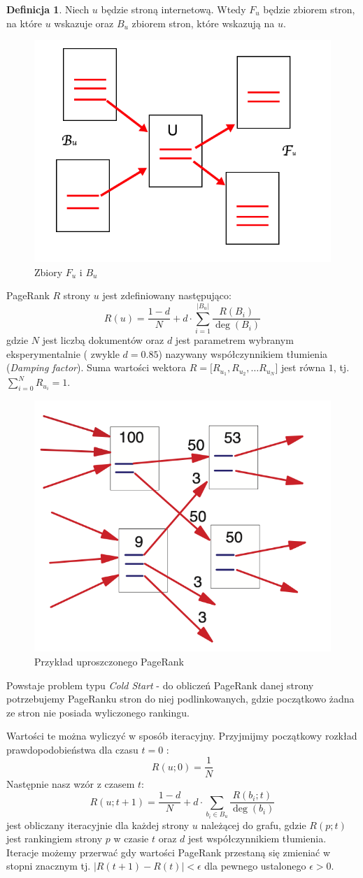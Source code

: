 \documentclass[licencjacka]{pracadypl}
\theoremstyle{definition}
\newtheorem{de}{Definicja}
\begin{document}
\begin{de}
	Niech $u$ będzie stroną internetową. 
	Wtedy $F_u$ będzie zbiorem stron, na które $u$ wskazuje oraz $B_u$ zbiorem stron, które wskazują na $u$.
	\begin{figure}[H]
		\centering
		\includegraphics[width=0.4\linewidth]{img/pagerank-link.png}
		\caption{Zbiory $F_u$ i $B_u$}
	\end{figure}
	
	PageRank $R$ strony $u$ jest zdefiniowany następująco:
	\[
	R(u) = 
	\frac{1-d}{N} +
	d \cdot 
	\sum\limits_{i=1}^{|B_u|}
	\frac{R(B_i)}
	{\deg(B_i)}
	\]
	gdzie $N$ jest liczbą dokumentów oraz $d$ jest parametrem wybranym eksperymentalnie ( zwykle $d=0.85$) nazywany współczynnikiem tłumienia (\textit{Damping factor}).
	Suma wartości wektora $R = \big[ R_{u_1}, R_{u_2}, \dots R_{u_N} \big]$ jest równa $1$, 
	tj. $\sum_{i=0}^{N} R_{u_i} = 1$.
	
\end{de}
\begin{figure}[H]
	\centering
	\includegraphics[width=0.4\linewidth]{img/pagerank-link2.png}
	\caption{Przykład uproszczonego PageRank}
\end{figure}

Powstaje problem typu \textit{Cold Start} - do obliczeń PageRank danej strony potrzebujemy PageRanku stron do niej podlinkowanych, gdzie początkowo żadna ze stron nie posiada wyliczonego rankingu.

Wartości te można wyliczyć w sposób iteracyjny.
Przyjmijmy początkowy rozkład prawdopodobieństwa dla czasu $t = 0$ :
\[
	R(u;0) = \frac{1}{N}
\]
Następnie nasz wzór z czasem $t$: 
	\[
		R(u ; t + 1) = 
		\frac{1-d}{N} +
		d \cdot 
		\sum\limits_{b_i \in B_u}
		\frac{R(b_i ; t)}
		{\deg(b_i)}
\]
jest obliczany iteracyjnie dla każdej strony $u$ należącej do grafu,
gdzie $R(p ; t)$ jest rankingiem strony $p$ w czasie $t$ oraz $d$ jest współczynnikiem tłumienia.
Iteracje możemy przerwać gdy wartości PageRank przestaną się zmieniać w stopni znacznym tj.
$\big| R(t+1) - R(t) \big| < \epsilon$ dla pewnego ustalonego $\epsilon > 0$.
\end{document}
